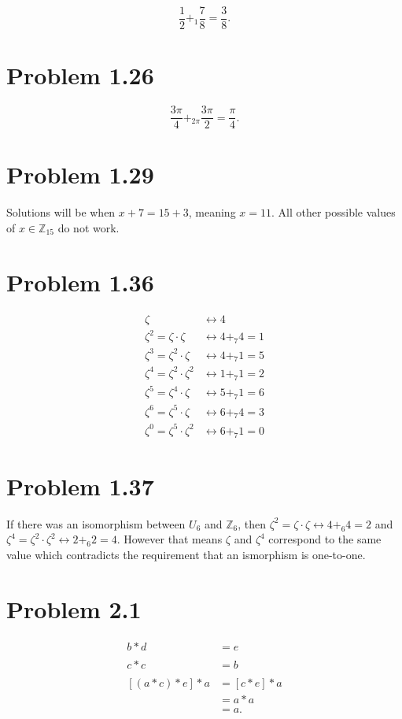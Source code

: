 \documentclass[12pt]{extarticle}
\begin{document}
\[
	\frac{1}{2} +_1 \frac{7}{8} = \frac{3}{8}
.\]

\section*{Problem 1.26}

\[
	\frac{3\pi}{4} +_{2\pi} \frac{3\pi}{2} = \frac{\pi}{4}
.\]

\section*{Problem 1.29}
Solutions will be when $x + 7 = 15 + 3$, meaning $x = 11$. All other possible values of $x \in \mathbb{Z}_15$ do not work.

\section*{Problem 1.36}
\begin{align*}
	\zeta &\leftrightarrow 4 \\
	\zeta^2 = \zeta \cdot \zeta &\leftrightarrow 4+_7 4 = 1 \\
	\zeta^3 = \zeta^2 \cdot \zeta &\leftrightarrow 4+_7 1 = 5 \\
	\zeta^4 = \zeta^2 \cdot \zeta^2 &\leftrightarrow 1+_7 1 = 2 \\
	\zeta^5 = \zeta^4 \cdot \zeta &\leftrightarrow 5+_7 1 = 6 \\
	\zeta^6 = \zeta^5 \cdot \zeta &\leftrightarrow 6+_7 4 = 3 \\
	\zeta^0 = \zeta^5 \cdot \zeta^2 &\leftrightarrow 6+_7 1 = 0
\end{align*}

\section*{Problem 1.37}
If there was an isomorphism between $U_6$ and $\mathbb{Z}_6$, then $\zeta^2 = \zeta \cdot \zeta \leftrightarrow 4 +_6 4 = 2$ and $\zeta^4 = \zeta^2 \cdot \zeta^2 \leftrightarrow 2 +_6 2 = 4$. However that means $\zeta$ and $\zeta^4$ correspond to the same value which contradicts the requirement that an ismorphism is one-to-one.

\section*{Problem 2.1}
\begin{align*}
	b * d &= e \\
	\\
	c * c &= b \\
	\\
	[(a * c) * e] * a &= [c * e] * a  \\
										&= a * a \\
										&= a
.\end{align*}
\end{document}
